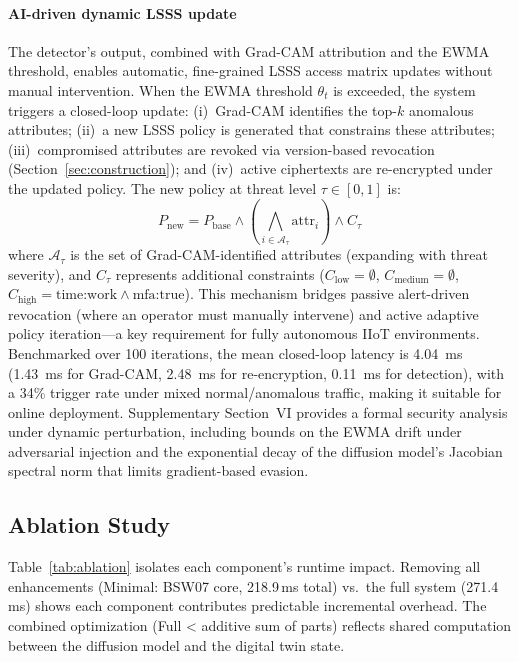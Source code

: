 \documentclass[lettersize,journal]{IEEEtran}
\begin{document}
\paragraph{AI-driven dynamic LSSS update}
The detector's output, combined with Grad-CAM attribution and the EWMA threshold, enables automatic, fine-grained LSSS access matrix updates without manual intervention. When the EWMA threshold $\theta_t$ is exceeded, the system triggers a closed-loop update: (i)~Grad-CAM identifies the top-$k$ anomalous attributes; (ii)~a new LSSS policy is generated that constrains these attributes; (iii)~compromised attributes are revoked via version-based revocation (Section~\ref{sec:construction}); and (iv)~active ciphertexts are re-encrypted under the updated policy. The new policy at threat level $\tau \in [0,1]$ is:
\[
P_{\text{new}} = P_{\text{base}} \land \left( \bigwedge_{i \in \mathcal{A}_{\tau}} \text{attr}_i \right) \land C_{\tau}
\]
where $\mathcal{A}_{\tau}$ is the set of Grad-CAM-identified attributes (expanding with threat severity), and $C_{\tau}$ represents additional constraints ($C_{\text{low}}=\emptyset$, $C_{\text{medium}}=\emptyset$, $C_{\text{high}} = \text{time:work} \land \text{mfa:true}$). This mechanism bridges passive alert-driven revocation (where an operator must manually intervene) and active adaptive policy iteration---a key requirement for fully autonomous IIoT environments. Benchmarked over 100 iterations, the mean closed-loop latency is 4.04~ms (1.43~ms for Grad-CAM, 2.48~ms for re-encryption, 0.11~ms for detection), with a 34\% trigger rate under mixed normal/anomalous traffic, making it suitable for online deployment. Supplementary Section~VI provides a formal security analysis under dynamic perturbation, including bounds on the EWMA drift under adversarial injection and the exponential decay of the diffusion model's Jacobian spectral norm that limits gradient-based evasion.

\subsection{Ablation Study}
\label{subsec:ablation}

Table~\ref{tab:ablation} isolates each component's runtime impact. Removing all enhancements (Minimal: BSW07 core, 218.9\,ms total) vs.~the full system (271.4\,ms) shows each component contributes predictable incremental overhead. The combined optimization (Full < additive sum of parts) reflects shared computation between the diffusion model and the digital twin state.
\end{document}

